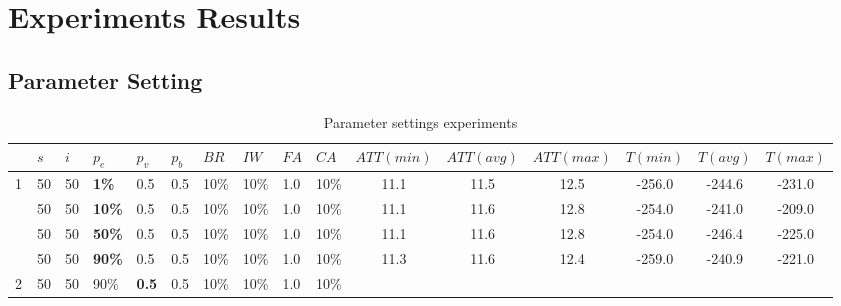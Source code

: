\chapter{Experiments Results}
\label{appendixC}

\section{Parameter Setting}

\begin{sidewaystable}
    \centering
	\begin{tabular}{|l|l|l|l|l|l|l|l|l|l||c|c|c|c|c|c|}
 	\hline
 	~ & $s$ & $i$ & $p_{e}$ & $p_{v}$ & $p_{b}$ & $BR$ &$IW$ & $FA$ & $CA$ &  $ATT(min)$ & $ATT(avg)$ & $ATT(max)$ & $T(min)$ & $T(avg)$ & $T(max)$\\
 	\hline
    1 & 50 & 50 & \textbf{1\%} & 0.5 & 0.5 & 10\% & 10\% & 1.0 & 10\% & 11.1 & 11.5 & 12.5 & -256.0 &-244.6 & -231.0  \\
    ~ & 50 & 50 & \textbf{10\%} & 0.5 & 0.5 & 10\% & 10\% & 1.0 & 10\% & 11.1 & 11.6 & 12.8 & -254.0 & -241.0 & -209.0 \\
    ~ & 50 & 50 & \textbf{50\%} & 0.5 & 0.5 & 10\% & 10\% & 1.0 & 10\% & 11.1 & 11.6 & 12.8 & -254.0 & -246.4 & -225.0\\
    ~ & 50 & 50 & \textbf{90\%} & 0.5 & 0.5 & 10\% & 10\% & 1.0 & 10\% &  11.3 & 11.6 & 12.4 & -259.0 & -240.9 & -221.0  \\
    \hline
    2 & 50 & 50 & 90\% & \textbf{0.5} & 0.5 & 10\% & 10\% & 1.0 & 10\% &  ~ & ~ & ~ & ~ & ~ & ~  \\
	\hline
    \end{tabular}
    \caption {Parameter settings experiments}
    \label{table:parameterSettings}
\end{sidewaystable}


